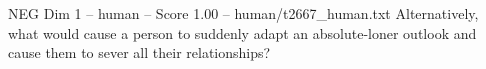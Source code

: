 \begin{textsample}{NEG Dim 1 – human – Score 1.00 – human/t2667\_human.txt}  \label{ex:f1_neg_015}
Alternatively, what would cause a person to suddenly adapt an absolute-loner outlook and cause them to sever all their relationships?

\end{textsample}
